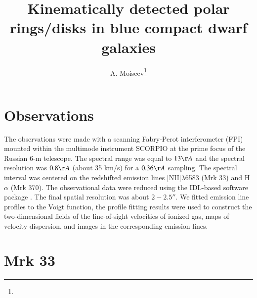 \documentclass[epjCONF]{svjour}
\begin{document}
%
\title{Kinematically detected polar rings/disks in blue compact dwarf galaxies}
\author{A. Moiseev\fnmsep\thanks{}}
%
%
%
\maketitle
%
\section{Observations}

The observations were made  with a scanning Fabry-Perot interferometer (FPI) mounted within the
multimode instrument SCORPIO \cite{Afanasiev2005} at the prime focus of  the Russian 6-m telescope. The spectral range was equal to $13\AA$ and the spectral resolution was $0.8\AA$ (about 35 km/s) for a $0.36\AA$ sampling. The spectral interval was centered on the redshifted emission lines [NII]$\lambda$6583 (Mrk 33) and H$\alpha$ (Mrk 370). The observational data were reduced using the IDL-based software package \cite{MoiseevEgorov2008}. The final spatial resolution was about $2-2.5''$. We fitted emission line profiles to the Voigt function, the profile fitting results were used to construct the two-dimensional fields of the line-of-sight velocities of ionized gas, maps of velocity dispersion, and images in the corresponding emission lines.

\section{Mrk 33}
\end{document}
